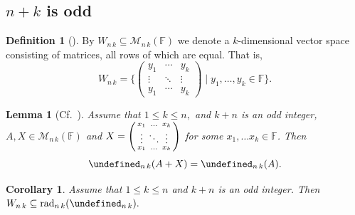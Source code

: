 \documentclass{elsarticle}
\let\det\undefined
\DeclareMathOperator{\det}{det}
\DeclareMathOperator{\rad}{rad}
\def\F{{\mathbb F}}
\def\M{{\mathcal M}}
\newenvironment{psmallmatrix}
  {\left(\begin{smallmatrix}}
  {\end{smallmatrix}\right)}
\newtheorem{lemma}[theorem]{Lemma}
\newtheorem{corollary}[theorem]{Corollary}
\theoremstyle{definition}
\newtheorem{definition}[theorem]{Definition}
\numberwithin{equation}{section}
\begin{document}
\subsection{$n + k$ is odd}


\begin{definition}[{\cite[Definition~3.6]{Guterman2025b}}]\label{def:WNK}By $W_{n\,k}\subseteq \M_{n\,k}(\F)$ we denote a $k$-dimensional vector space consisting of matrices, all rows of which are equal. That is,
\[
W_{n\,k} = \{\begin{pmatrix}y_1 & \cdots & y_k\\ \vdots & \ddots & \vdots\\ y_1 & \cdots & y_k\end{pmatrix} \mid y_1, \ldots, y_k \in \F\}.
 \]
\end{definition}


\begin{lemma}[{Cf.~\cite[Theorem~3.3]{amiri2010}}]\label{lem:AdditionNPLusKOdd}
Assume that $1 \le k \le n,$ and $k + n$ is an odd integer, $A, X \in \M_{n\, k}(\F)$ and $X = \begin{psmallmatrix}
x_1 & \ldots & x_k\\
\vdots & \ddots & \vdots\\
x_1 & \ldots & x_k
\end{psmallmatrix}$ for some $x_1,\ldots x_k \in \F$. Then
\[
\det_{n\,k} (A + X) = \det_{n\,k} (A).
\]
\end{lemma}

\begin{corollary}\label{cor:WNKIsInRadDetNK}Assume that $1 \le k \le n$ and $k + n$ is an odd integer. Then $W_{n\,k} \subseteq \rad_{n\,k}(\det_{n\,k}).$
\end{corollary}
\end{document}
